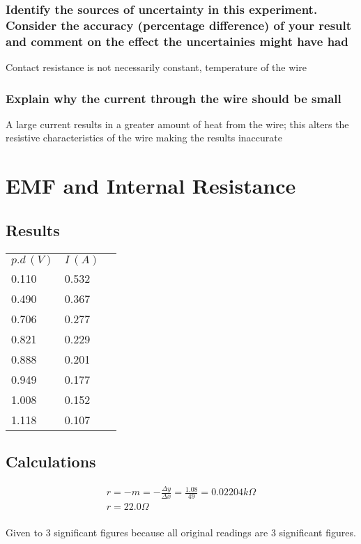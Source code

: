 \documentclass{article}
\begin{document}
\subsubsection{Identify the sources of uncertainty in this experiment. Consider the accuracy (percentage difference) of your result and comment on the effect the uncertainies might have had}
Contact resistance is not necessarily constant, temperature of the wire

\subsubsection{Explain why the current through the wire should be small}
A large current results in a greater amount of heat from the wire; this
alters the resistive characteristics of the wire making the results inaccurate

\break

\section{EMF and Internal Resistance}

\subsection{Results}

\begin{center}
\begin{tabular}{l|ll}
$p.d\, (\si{V})$   & $I\, (\si{A})$  &  \\ \cline{1-2}
0.110 & 0.532 & \\
0.490 & 0.367 & \\
0.706 & 0.277 & \\
0.821 & 0.229 & \\
0.888 & 0.201 & \\
0.949 & 0.177 & \\
1.008 & 0.152 & \\
1.118 & 0.107 & \\
\end{tabular}
\end{center}



\subsection{Calculations}

\begin{gather}
	r = -m = - \frac{\Delta y}{\Delta x} = \frac{1.08}{49} = 0.02204 \si{k\Omega} \\
	r = 22.0 \si{\Omega}
\end{gather}
\\
Given to 3 significant figures because all original readings are 3 significant figures.
\end{document}
